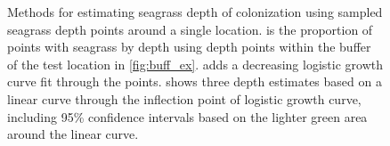 \documentclass[letterpaper,12pt,oneside]{article}\usepackage[]{graphicx}\usepackage[]{color}
\begin{document}
\begin{figure}
\centering
{}


\caption{Methods for estimating seagrass depth of colonization using sampled seagrass depth points around a single location.  is the proportion of points with seagrass by depth using depth points within the buffer of the test location in \cref{fig:buff_ex}.   adds a decreasing logistic growth curve fit through the points.   shows three depth estimates based on a linear curve through the inflection point of logistic growth curve, including 95\% confidence intervals based on the lighter green area around the linear curve.}
\label{fig:est_ex}
\end{figure}

\end{document}
